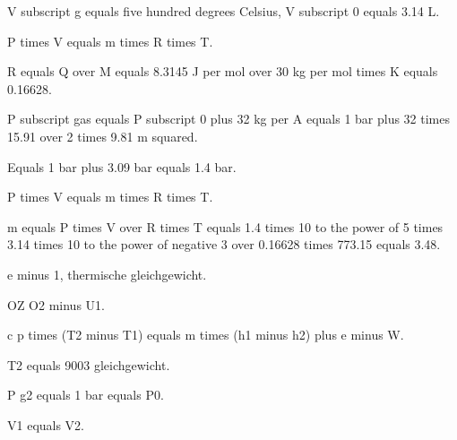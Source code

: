 V subscript g equals five hundred degrees Celsius, V subscript 0 equals 3.14 L.

P times V equals m times R times T.

R equals Q over M equals 8.3145 J per mol over 30 kg per mol times K equals 0.16628.

P subscript gas equals P subscript 0 plus 32 kg per A equals 1 bar plus 32 times 15.91 over 2 times 9.81 m squared.

Equals 1 bar plus 3.09 bar equals 1.4 bar.

P times V equals m times R times T.

m equals P times V over R times T equals 1.4 times 10 to the power of 5 times 3.14 times 10 to the power of negative 3 over 0.16628 times 773.15 equals 3.48.

e minus 1, thermische gleichgewicht.

OZ O2 minus U1.

c p times (T2 minus T1) equals m times (h1 minus h2) plus e minus W.

T2 equals 9003 gleichgewicht.

P g2 equals 1 bar equals P0.

V1 equals V2.